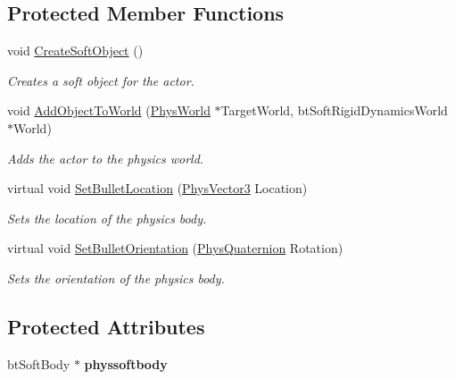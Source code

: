 \subsection*{Protected Member Functions}
\begin{DoxyCompactItemize}
\item 
void \hyperlink{classActorDynSoft_a249bc0621b1d55ea0a9c7787605078d6}{CreateSoftObject} ()
\begin{DoxyCompactList}\small\item\em Creates a soft object for the actor. \item\end{DoxyCompactList}\item 
void \hyperlink{classActorDynSoft_ab56b961689401e16962d653b977e5fd6}{AddObjectToWorld} (\hyperlink{classPhysWorld}{PhysWorld} $\ast$TargetWorld, btSoftRigidDynamicsWorld $\ast$World)
\begin{DoxyCompactList}\small\item\em Adds the actor to the physics world. \item\end{DoxyCompactList}\item 
virtual void \hyperlink{classActorDynSoft_aaf548f7849f59956c10d79420efafffb}{SetBulletLocation} (\hyperlink{classPhysVector3}{PhysVector3} Location)
\begin{DoxyCompactList}\small\item\em Sets the location of the physics body. \item\end{DoxyCompactList}\item 
virtual void \hyperlink{classActorDynSoft_abbb2c795bd07b014239f157b440bc53d}{SetBulletOrientation} (\hyperlink{classPhysQuaternion}{PhysQuaternion} Rotation)
\begin{DoxyCompactList}\small\item\em Sets the orientation of the physics body. \item\end{DoxyCompactList}\end{DoxyCompactItemize}
\subsection*{Protected Attributes}
\begin{DoxyCompactItemize}
\item 
\hypertarget{classActorDynSoft_a59e1b9ae866bfd9af4bc2eebaf11a2d9}{
btSoftBody $\ast$ {\bfseries physsoftbody}}
\label{dc/de0/classActorDynSoft_a59e1b9ae866bfd9af4bc2eebaf11a2d9}

\end{DoxyCompactItemize}


